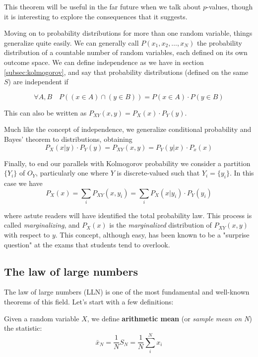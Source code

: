 This theorem will be useful in the far future when we talk about $p$-values, though it is interesting to explore the consequences that it suggests.

Moving on to probability distributions for more than one random variable, things generalize quite easily. We can generally call $P(x_1, \allowbreak x_2, \allowbreak \dots, \allowbreak x_N)$ the probability distribution of a countable number of random variables, each defined on its own outcome space. We can define independence as we have in section \ref{subsec:kolmogorov}, and say that probability distributions (defined on the same $S$) are independent if 


	\[
	\forall A,B \quad P\left( \left( x\in A\right) \cap \left( y\in B\right) \right)  = P\left( x\in A\right) \cdot P\left( y\in B\right) 
	\]
	


This can also be written as $P_{XY}(x,y)=P_X(x)\cdot P_Y(y)$.



Much like the concept of independence, we generalize conditional probability and Bayes' theorem to distributions, obtaining
	\[
	P_X(x|y)\cdot P_Y(y) = P_{XY}(x,y) = P_Y(y|x)\cdot P_x(x)
	\]
	
Finally, to end our parallels with Kolmogorov probability we consider a partition $\{Y_i\}$ of $O_Y$, particularly one where $Y$ is discrete-valued such that $Y_i = \{y_i\}$. In this case we have
	\[
	P_X(x) = \sum_i P_{XY}(x,y_i)=\sum_i P_X(x|y_i)\cdot P_Y(y_i)
	\]
	
where astute readers will have identified the total probability law. This process is called \emph{marginalizing}, and $P_X(x)$ is the \emph{marginalized} distribution of $P_{XY}(x,y)$ with respect to $y$. This concept, although easy, has been known to be a "surprise question" at the exams that students tend to overlook.

\subsection{The law of large numbers}
\label{subsec:LLN}
The law of large numbers (LLN) is one of the most fundamental and well-known theorems of this field. Let's start with a few definitions:
\begin{definition}
	Given a random variable $X$, we define \textbf{arithmetic mean} (or \emph{sample mean on N}) the statistic:
	\[
	\bar{x}_N = \frac{1}{N}S_N = \frac{1}{N}\sum_i^N x_i
	\]
\end{definition}

